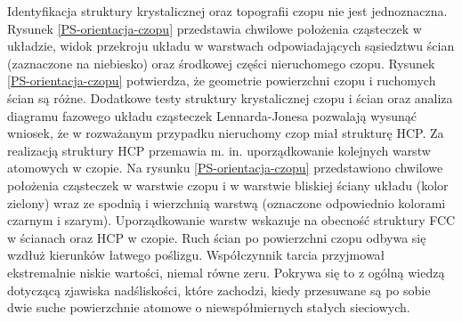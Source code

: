 \documentclass[12pt,a4paper,openright]{report} %
\begin{document}
Identyfikacja struktury krystalicznej \linebreak oraz topografii czopu nie jest jednoznaczna. Rysunek \ref{PS-orientacja-czopu} przedstawia chwilowe położenia cząsteczek w układzie, widok przekroju układu w warstwach odpowiadających sąsiedztwu ścian (zaznaczone na niebiesko) oraz środkowej części nieruchomego czopu. Rysunek \ref{PS-orientacja-czopu} potwierdza, że geometrie powierzchni czopu i ruchomych ścian są różne. Dodatkowe testy struktury krystalicznej czopu i ścian oraz analiza diagramu fazowego układu cząsteczek Lennarda-Jonesa pozwalają wysunąć wniosek, że w rozważanym przypadku nieruchomy czop miał strukturę HCP. Za realizacją struktury HCP przemawia m. in. uporządkowanie kolejnych warstw atomowych w czopie. Na rysunku \ref{PS-orientacja-czopu} przedstawiono chwilowe położenia cząsteczek w warstwie czopu i w warstwie bliskiej ściany układu (kolor zielony) wraz ze spodnią i wierzchnią warstwą (oznaczone odpowiednio kolorami czarnym i szarym). Uporządkowanie warstw wskazuje na obecność struktury FCC w ścianach oraz HCP w czopie. Ruch ścian po powierzchni czopu odbywa się wzdłuż kierunków łatwego poślizgu. Współczynnik tarcia przyjmował ekstremalnie niskie wartości, niemal równe zeru. Pokrywa się to z ogólną wiedzą dotyczącą zjawiska nadśliskości, które zachodzi, kiedy przesuwane są po sobie dwie suche powierzchnie atomowe o niewspółmiernych stałych sieciowych. 
%
\end{document}

